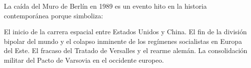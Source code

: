 \documentclass[12pt]{evaluasep}
\begin{document}
\begin{questions}
    \question La caída del Muro de Berlín en 1989 es un evento hito en la historia contemporánea porque simboliza:
    \begin{choices}
        \choice El inicio de la carrera espacial entre Estados Unidos y China.
        \CorrectChoice El fin de la división bipolar del mundo y el colapso inminente de los regímenes socialistas en Europa del Este.
        \choice El fracaso del Tratado de Versalles y el rearme alemán.
        \choice La consolidación militar del Pacto de Varsovia en el occidente europeo.
    \end{choices}
	
	
\end{questions}
\end{document}
